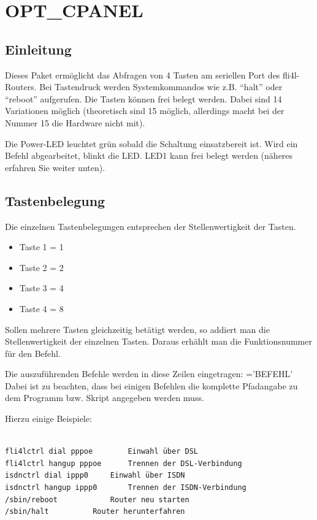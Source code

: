 {
\section {OPT\_CPANEL}
}

\subsection{Einleitung}

Dieses Paket ermöglicht das Abfragen von 4 Tasten am seriellen Port des fli4l-Routers.
Bei Tastendruck werden Systemkommandos wie z.B. ``halt'' oder ``reboot'' aufgerufen. Die Tasten 
können frei belegt werden. Dabei sind 14 Variationen möglich (theoretisch sind 15 
möglich, allerdings macht bei der Nummer 15 die Hardware nicht mit). 

Die Power-LED leuchtet grün sobald die Schaltung einsatzbereit ist. Wird ein Befehl 
abgearbeitet, blinkt die LED. 
LED1 kann frei belegt werden (näheres erfahren Sie weiter unten).


\subsection{Tastenbelegung}

Die einzelnen Tastenbelegungen entsprechen der Stellenwertigkeit der Tasten.

\begin{itemize}
    \item Taste 1 = 1
    \item Taste 2 = 2
    \item Taste 3 = 4
    \item Taste 4 = 8
\end{itemize}

Sollen mehrere Tasten gleichzeitig betätigt werden, so addiert man die Stellenwertigkeit 
der einzelnen Tasten. Daraus erhählt man die Funktionsnummer für den Befehl.

Die auszuführenden Befehle werden in diese Zeilen eingetragen:
='BEFEHL'
Dabei ist zu beachten, dass bei einigen Befehlen die komplette Pfadangabe zu dem Programm 
bzw. Skript angegeben werden muss.

Hierzu einige Beispiele:
\begin{verbatim}

fli4lctrl dial pppoe		Einwahl über DSL
fli4lctrl hangup pppoe		Trennen der DSL-Verbindung 
isdnctrl dial ippp0		Einwahl über ISDN
isdnctrl hangup ippp0		Trennen der ISDN-Verbindung
/sbin/reboot			Router neu starten
/sbin/halt			Router herunterfahren

\end{verbatim}

